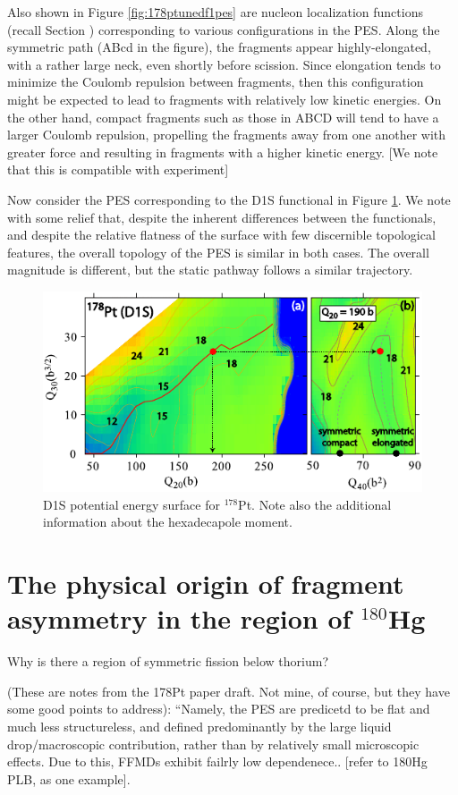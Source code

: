 Also shown in Figure \ref{fig:178ptunedf1pes} are nucleon localization functions (recall Section ) corresponding to various configurations in the PES. Along the symmetric path (ABcd in the figure), the fragments appear highly-elongated, with a rather large neck, even shortly before scission. Since elongation tends to minimize the Coulomb repulsion between fragments, then this configuration might be expected to lead to fragments with relatively low kinetic energies. On the other hand, compact fragments such as those in ABCD will tend to have a larger Coulomb repulsion, propelling the fragments away from one another with greater force and resulting in fragments with a higher kinetic energy. [We note that this is compatible with experiment]

Now consider the PES corresponding to the D1S functional in Figure \ref{fig:178ptd1spes}. We note with some relief that, despite the inherent differences between the functionals, and despite the relative flatness of the surface with few discernible topological features, the overall topology of the PES is similar in both cases. The overall magnitude is different, but the static pathway follows a similar trajectory.

\begin{figure}
	\centering
	\includegraphics[width=0.7\linewidth]{TeX_files/178Pt_D1S_pes}
	\caption[D1S potential energy surface for $^{178}$Pt]{D1S potential energy surface for $^{178}$Pt. Note also the additional information about the hexadecapole moment.}
	\label{fig:178ptd1spes}
\end{figure}



\section{The physical origin of fragment asymmetry in the region of $^{180}$Hg}

Why is there a region of symmetric fission below thorium?

(These are notes from the 178Pt paper draft. Not mine, of course, but they have some good points to address): ``Namely, the PES are predicetd to be flat and much less structureless, and defined predominantly by the large liquid drop/macroscopic contribution, rather than by relatively small microscopic effects. Due to this, FFMDs exhibit failrly low dependenece..  [refer to 180Hg PLB, as one example].


